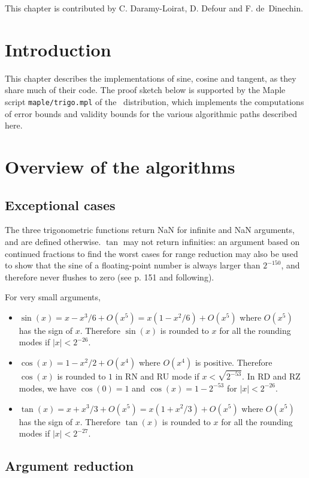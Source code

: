 This chapter is contributed by C. Daramy-Loirat, D. Defour
and F. de~Dinechin.  

\section*{Introduction}
This chapter describes the implementations of sine, cosine and
tangent, as they share much of their code. The proof sketch below is
supported by the Maple script \texttt{maple/trigo.mpl} of the \crlibm\
distribution, which implements the computations of error bounds and
validity bounds for the various algorithmic paths described here.

\section{Overview of the algorithms}

\subsection{Exceptional cases}

The three trigonometric functions return NaN for infinite and NaN
arguments, and are defined otherwise. $\tan$ may not return
infinities: an argument based on continued fractions to find the worst
cases for range reduction may also be used to show that the sine of a
floating-point number is always larger than $2^{-150}$, and therefore
never flushes to zero (see \cite{Muller97} p. 151 and following).

For very small arguments,
\begin{itemize}
\item $\sin(x) = x-x^3/6 + O(x^5) = x(1-x^2/6) + O(x^5)$ where
  $O(x^5)$ has the sign of $x$. Therefore $\sin(x)$ is rounded to $x$
  for all the rounding  modes if $|x|<2^{-26}$.
\item $\cos(x) = 1-x^2/2 + O(x^4)$ where $O(x^4)$ is positive.
  Therefore $\cos(x)$ is rounded to $1$ in RN and RU mode if
  $x<\sqrt{2^{-53}}$. In RD and RZ modes, we have $\cos(0)=1$ and
  $\cos(x)=1-2^{-53}$ for $|x|<2^{-26}$.
\item $\tan(x) = x+x^3/3 + O(x^5) = x(1+x^2/3) + O(x^5)$ where
  $O(x^5)$ has the sign of $x$. Therefore $\tan(x)$ is rounded to $x$
  for all the rounding  modes if $|x|<2^{-27}$.
\end{itemize}


\subsection{Argument reduction}

